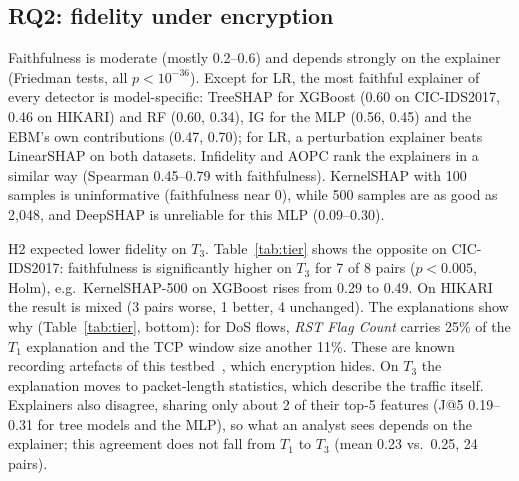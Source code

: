 \documentclass[pdflatex,iicol,sn-mathphys-num]{sn-jnl}
\begin{document}
\subsection{RQ2: fidelity under encryption}
Faithfulness is moderate (mostly 0.2--0.6) and depends strongly on the explainer (Friedman tests, all $p<10^{-36}$). Except for LR, the most faithful explainer of every detector is model-specific: TreeSHAP for XGBoost (0.60 on CIC-IDS2017, 0.46 on HIKARI) and RF (0.60, 0.34), IG for the MLP (0.56, 0.45) and the EBM's own contributions (0.47, 0.70); for LR, a perturbation explainer beats LinearSHAP on both datasets. Infidelity and AOPC rank the explainers in a similar way (Spearman 0.45--0.79 with faithfulness). KernelSHAP with 100 samples is uninformative (faithfulness near 0), while 500 samples are as good as 2{,}048, and DeepSHAP is unreliable for this MLP (0.09--0.30).

H2 expected lower fidelity on $T_3$. Table~\ref{tab:tier} shows the opposite on CIC-IDS2017: faithfulness is significantly higher on $T_3$ for 7 of 8 pairs ($p<0.005$, Holm), e.g.\ KernelSHAP-500 on XGBoost rises from 0.29 to 0.49. On HIKARI the result is mixed (3 pairs worse, 1 better, 4 unchanged). The explanations show why (Table~\ref{tab:tier}, bottom): for DoS flows, \emph{RST Flag Count} carries 25\% of the $T_1$ explanation and the TCP window size another 11\%. These are known recording artefacts of this testbed~\cite{engelen2021}, which encryption hides. On $T_3$ the explanation moves to packet-length statistics, which describe the traffic itself. Explainers also disagree, sharing only about 2 of their top-5 features (J@5 0.19--0.31 for tree models and the MLP), so what an analyst sees depends on the explainer; this agreement does not fall from $T_1$ to $T_3$ (mean 0.23 vs.\ 0.25, 24 pairs).
\end{document}
